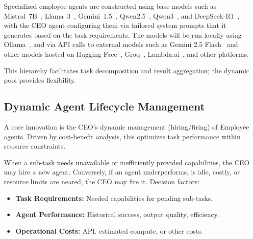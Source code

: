 \documentclass[conference]{IEEEtran}
\begin{document}
\begin{itemize}
\begin{itemize}
        \end{itemize}
        Specialized employee agents are constructed using base models such as Mistral~7B~\cite{jiang2023mistral}, Llama~3~\cite{llama3herd}, Gemini~1.5~\cite{gemini1.5_report}, Qwen2.5~\cite{qwen2.5_report}, Qwen3~\cite{qwen3_blog}, and DeepSeek-R1~\cite{deepseekr1_report}, with the CEO agent configuring them via tailored system prompts that it generates based on the task requirements.
        The models will be run locally using Ollama~\cite{ollama}, and via API calls to external models such as Gemini 2.5 Flash~\cite{gemini25flash} and other models hosted on Hugging Face~\cite{huggingface2025}, Groq~\cite{groq2025}, Lambda.ai~\cite{lambda2025}, and other platforms.
\end{itemize}
This hierarchy facilitates task decomposition and result aggregation; the dynamic pool provides flexibility.

\subsection{Dynamic Agent Lifecycle Management}
\label{subsec:dynamic_mgmt}
A core innovation is the CEO's dynamic management (hiring/firing) of Employee agents. Driven by cost-benefit analysis, this optimizes task performance within resource constraints.

When a sub-task needs unavailable or inefficiently provided capabilities, the CEO may hire a new agent. Conversely, if an agent underperforms, is idle, costly, or resource limits are neared, the CEO may fire it. Decision factors:
\begin{itemize}
    \item \textbf{Task Requirements:} Needed capabilities for pending sub-tasks.
    \item \textbf{Agent Performance:} Historical success, output quality, efficiency.
    \item \textbf{Operational Costs:} API, estimated compute, or other costs.
\end{itemize}
\end{document}

